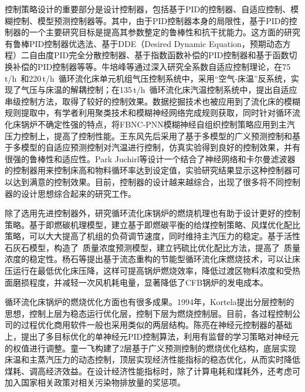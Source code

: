 控制策略设计的重要部分是设计控制器，包括基于PID的控制器、自适应控制、模糊控制、模型预测控制器等。其中，由于PID控制器本身的局限性，基于PID的控制器的一个主要研究目标是提高其参数整定的鲁棒性和抗干扰能力。这方面的研究有鲁棒PID控制器优选法、基于DDE（Desired Dynamic Equation，预期动态方程）二自由度PID完全分散控制器、基于指数函数补偿的PID控制器和基于函数切换补偿的PID控制器等等\cite{徐峰2002鲁棒,郝玉春2012循环流化床燃烧系统的,郝玉春2013基于}。牛培峰等通过深入研究全系数自适应控制理论，在75$\,$\si[per-mode=symbol]{\tonne\per\hour}~和220$\,$\si[per-mode=symbol]{\tonne\per\hour}~循环流化床单元机组气压控制系统中，采用“空气-床温”反系统，实现了气压与床温的解耦控制；在135$\,$\si[per-mode=symbol]{\tonne\per\hour}~循环流化床汽温控制系统中，提出自适应串级控制方法，取得了较好的控制效果。数据挖掘技术也被应用到了流化床的模糊规则提取中，有学者利用聚类技术和模糊神经网络完成规则获取，同时针对循环流化床锅炉不确定性强的特点，将FBNC-PNN模糊神经自组织控制策略应用到主汽压力控制上，提高了控制性能\cite{王志强2003数据挖掘技术在循环流化床锅炉模糊控制系统中的应用}。王东风先后采用了基于多模型的广义预测控制和基于多模型的自适应预测控制对汽温进行控制，仿真实验得到良好的控制效果，并有很强的鲁棒性和适应性\cite{王东风2003循环流化床锅炉汽温系统的多模型自适应预测控制}。Park Juchirl等设计一个结合了神经网络和卡尔曼滤波器的控制器用来控制床高和物料循环率达到设定值，实验研究结果显示这种控制器可以达到满意的控制效果\cite{Park2005The}。目前，控制器的设计越来越综合，出现了很多将不同控制器的设计思想综合起来的研究工作。

除了选用先进控制器外，研究循环流化床锅炉的燃烧机理也有助于设计更好的控制策略。基于即燃碳机理模型，建立基于即燃碳平衡的给煤控制策略、风煤优化配比策略，可以大大提高了机组的负荷调节速度，同时维持主汽压力的稳定。基于活性石灰石模型，构造了~质量浓度预测模型，建立钙硫比优化配比方法，提高了~质量浓度的稳定性\cite{高明明2014600MW}。杨石等提出基于流态重构的节能型循环流化床燃烧技术，可以让床压运行在最低优化床压降，这样可提高锅炉燃烧效率，降低过渡区物料浓度和受热面磨损程度，并减轻一次风机耗电量，显著降低了CFB锅炉的发电成本\cite{杨石2010基于流态重构的低能耗循环流化床锅炉技术}。

循环流化床锅炉的燃烧优化方面也有很多成果。1994年，Kortela提出分层控制的思想，控制上层为稳态运行优化层，控制下层为燃烧控制层\cite{kortela1994modelling}。目前，各过程控制公司的过程优化商用软件一般也采用类似的两层结构。陈亮在神经元控制器的基础上，提出了多目标优化的单神经元PID控制算法，利用有监督的学习策略对神经元的权值进行调整\cite{陈亮2005循环流化床锅炉建模及其智能控制系统的研究}。童一飞构建了2层基于广义预测控制的燃烧优化结构，底层实现床温和主蒸汽压力的动态控制，顶层实现经济性能指标的稳态优化，从而实时降低煤耗、调高经济效益\cite{童一飞2010基于广义预测控制的循环流化床锅炉燃烧过程多目标优化控制策略}。在设计经济性能指标时，除了计算电耗和煤耗外，还考虑可加入国家相关政策对相关污染物排放量的奖惩项\cite{谢磊2016循环流化床锅炉燃烧过程预测控制与经济性能优化}。

